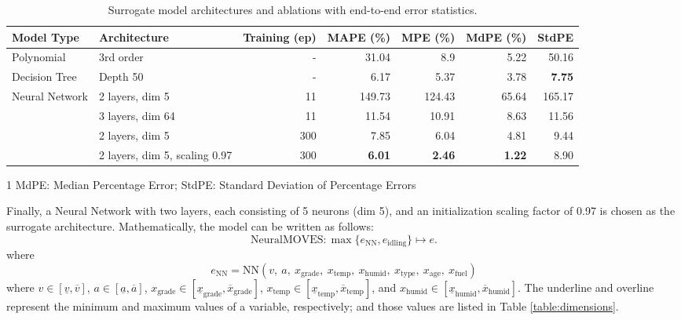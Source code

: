 \documentclass[12pt,english]{article}
\begin{document}
\begin{table}[ht]
\centering
\footnotesize
\caption{Surrogate model architectures and ablations with end-to-end error statistics.}
\label{table:ablations}
\setlength\tabcolsep{8pt} 
\begin{tabular}{llrrrrr}
\toprule
Model Type            & Architecture                      & Training (ep)   & MAPE (\%)     & MPE (\%)      & MdPE (\%)     & StdPE        \\ 
\midrule
Polynomial            & 3rd order                         & -               & 31.04         & 8.9           & 5.22          & 50.16       \\
Decision Tree         & Depth 50                          & -               & 6.17          & 5.37          & 3.78          & \textbf{7.75} \\
\multirow{4}{*}{Neural Network} & 2 layers, dim 5                   & 11              & 149.73        & 124.43        & 65.64         & 165.17      \\
                                 & 3 layers, dim 64                  & 11              & 11.54         & 10.91         & 8.63          & 11.56       \\
                                 & 2 layers, dim 5                   & 300             & 7.85          & 6.04          & 4.81          & 9.44        \\
                                 & 2 layers, dim 5, scaling 0.97     & 300             & \textbf{6.01} & \textbf{2.46} & \textbf{1.22} & 8.90        \\
\bottomrule
\end{tabular}
\begin{tablenotes}\footnotesize
\item[1] \hspace{-2mm} MdPE: Median Percentage Error; StdPE: Standard Deviation of Percentage Errors
\end{tablenotes}  
\end{table}


Finally, a Neural Network with two layers, each consisting of 5 neurons (dim 5), and an initialization scaling factor of 0.97 is chosen as the surrogate architecture. 
Mathematically, the model can be written as follows:
\begin{equation}
    \text{NeuralMOVES}: \max\{e_\text{NN}, e_\text{idling}\} \mapsto e.
\end{equation}
where 
\begin{equation}
    e_\text{NN}=\text{NN}(v, \ a, \ x_\text{grade}, \ x_\text{temp}, \ x_\text{humid}, \ x_\text{type}, \ x_\text{age}, \ x_\text{fuel})
\end{equation}
where \( v \in [ \underline{v}, \overline{v} ] \),
\( a \in [ \underline{a}, \overline{a} ] \),
\( x_\text{grade} \in [ \underline{x}_\text{grade}, \overline{x}_\text{grade} ] \),
\( x_\text{temp} \in [ \underline{x}_\text{temp}, \overline{x}_\text{temp} ] \),
and \( x_\text{humid} \in [ \underline{x}_\text{humid}, \overline{x}_\text{humid} ] \).
The underline and overline represent the minimum and maximum values of a variable, respectively; and those values are listed in Table \ref{table:dimensions}.
\end{document}
